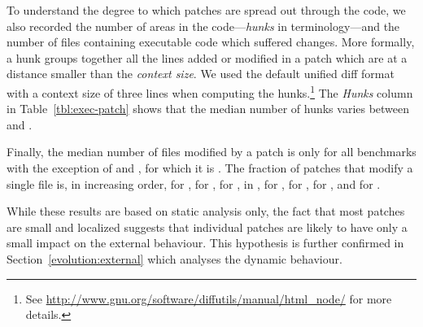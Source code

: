 
To understand the degree to which patches are spread out through the code, we
also recorded the number of areas in the code---\textit{hunks} in \git
terminology---and the number of files containing executable code which suffered
changes.  More formally, a hunk groups together all the lines added or modified
in a patch which are at a distance smaller than the \textit{context size}.  We
used the default unified diff format with a context size of three lines when
computing the hunks.\footnote{See
\url{http://www.gnu.org/software/diffutils/manual/html_node/} for more
details.}  The \textit{Hunks} column in Table~\ref{tbl:exec-patch} shows that
the median number of hunks varies between \binutilseHunkThreeMedian and
\zeromqeHunkThreeMedian.

Finally, the median number of files modified by a patch is only
\rediseFileMedian for all benchmarks with the exception of \vim and \zeromq,
for which it is \zeromqeFileMedian. The fraction of patches that modify a
single file is, in increasing order, \vimOneeFilePatches for \vim,
\zeromqOneeFilePatches for \zeromq, \gitOneeFilePatches for \git,
\beanstalkdOneeFilePatches in \beanstalkd, \lighttpdtwoOneeFilePatches for
\lighttpdtwo, \memcachedOneeFilePatches for \memcached, \redisOneeFilePatches
for \redis, and \binutilsOneeFilePatches for \binutils.

While these results are based on static analysis only, the fact that most
patches are small and localized suggests that individual patches are likely to
have only a small impact on the external behaviour. This hypothesis is further
confirmed in Section~\ref{evolution:external} which analyses the dynamic
behaviour.


